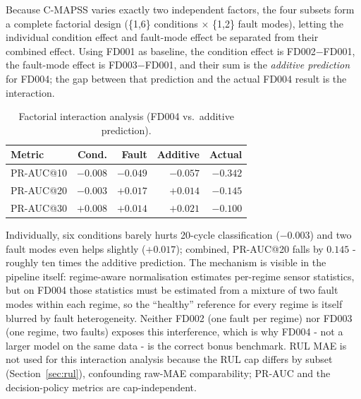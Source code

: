 \documentclass[9pt,a4paper,twocolumn,twoside]{rho-class/rho}
\begin{document}
        Because C-MAPSS varies exactly two independent factors, the four subsets form a complete factorial design (\{1,6\} conditions $\times$ \{1,2\} fault modes), letting the individual condition effect and fault-mode effect be separated from their combined effect. Using FD001 as baseline, the condition effect is FD002$-$FD001, the fault-mode effect is FD003$-$FD001, and their sum is the \emph{additive prediction} for FD004; the gap between that prediction and the actual FD004 result is the interaction.

        \begin{table}[H]
            \caption{Factorial interaction analysis (FD004 vs.\ additive prediction).}
            \label{tab:interaction}
            \begin{tabular}{lrrrr}
            \toprule
            \textbf{Metric} & \textbf{Cond.} & \textbf{Fault} & \textbf{Additive} & \textbf{Actual} \\
            \midrule
            PR-AUC@10 & $-0.008$ & $-0.049$ & $-0.057$ & $-0.342$ \\
            PR-AUC@20 & $-0.003$ & $+0.017$ & $+0.014$ & $-0.145$ \\
            PR-AUC@30 & $+0.008$ & $+0.014$ & $+0.021$ & $-0.100$ \\
            \bottomrule
            \end{tabular}
        \end{table}

        Individually, six conditions barely hurts 20-cycle classification ($-0.003$) and two fault modes even helps slightly ($+0.017$); combined, PR-AUC@20 falls by $0.145$ - roughly ten times the additive prediction. The mechanism is visible in the pipeline itself: regime-aware normalisation estimates per-regime sensor statistics, but on FD004 those statistics must be estimated from a mixture of two fault modes within each regime, so the ``healthy'' reference for every regime is itself blurred by fault heterogeneity. Neither FD002 (one fault per regime) nor FD003 (one regime, two faults) exposes this interference, which is why FD004 - not a larger model on the same data - is the correct bonus benchmark. RUL MAE is not used for this interaction analysis because the RUL cap differs by subset (Section~\ref{sec:rul}), confounding raw-MAE comparability; PR-AUC and the decision-policy metrics are cap-independent.
\end{document}
